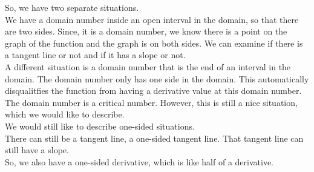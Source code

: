 \documentclass{ximera}
\begin{document}
So, we have two separate situations. \\


We have a domain number inside an open interval in the domain, so that there are two sides. Since, it is a domain number, we know there is a point on the graph of the function and the graph is on both sides.  We can examine if there is a tangent line or not and if it has a slope or not. \\

A different situation is a domain number that is the end of an interval in the domain.  The domain number only has one side in the domain.  This automatically disqualitfies the function from having a derivative value at this domain number.  The domain number is a critical number.  However, this is still a nice situation, which we would like to describe. \\

We would still like to describe one-sided situations. \\

There can still be a tangent line, a one-sided tangent line. That tangent line can still have a slope. \\

So, we also have a one-sided derivative, which is like half of a derivative. \\
\end{document}

